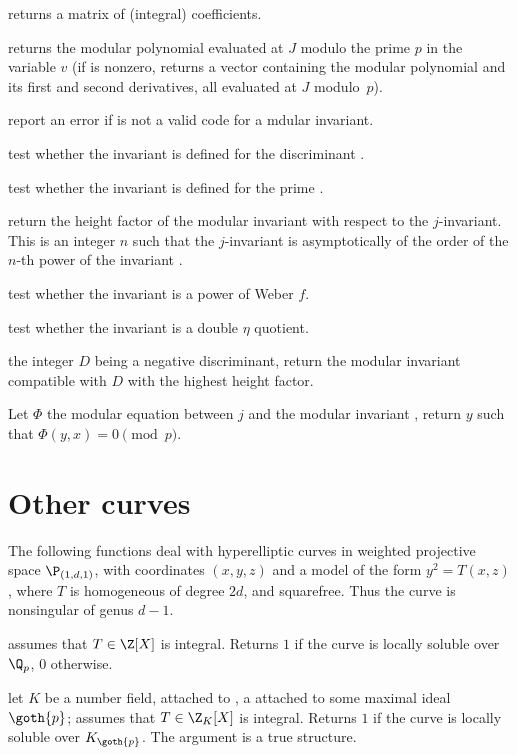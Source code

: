  returns a matrix of
(integral) coefficients.

 returns the modular polynomial evaluated
at $J$ modulo the prime $p$ in the variable $v$ (if  is nonzero,
returns a vector containing the modular polynomial and its first and second
derivatives, all evaluated at $J$ modulo~$p$).


 report an error if  is not a
valid code for a mdular invariant.

 test whether the
invariant  is defined for the discriminant .

 test whether the
invariant  is defined for the prime .

 return the height factor
of the modular invariant  with respect to the $j$-invariant.
This is an integer $n$ such that the $j$-invariant is asymptotically
of the order of the $n$-th power of the invariant .

 test whether the invariant
 is a power of Weber $f$.

 test whether the invariant
 is a double $\eta$ quotient.

 the integer $D$ being a negative discriminant,
return the modular invariant compatible with $D$ with the highest height
factor.

 Let $\Phi$ the modular equation
between $j$ and the modular invariant , return $y$ such that
$\Phi(y,x)=0\pmod{p}$.

\section{Other curves}

The following functions deal with hyperelliptic curves in weighted projective
space $\P_{(1,d,1)}$, with coordinates $(x,y,z)$ and a model of the form
$ y^2 = T(x,z)$, where $T$ is homogeneous of degree $2d$, and squarefree.
Thus the curve is nonsingular of genus $d-1$.

 assumes that $T\in\Z[X]$ is
integral. Returns $1$ if the curve is locally soluble over $\Q_p$, $0$
otherwise.

 let $K$
be a number field, attached to ,  a  attached
to some maximal ideal $\goth{p}$; assumes that $T\in\Z_K[X]$ is integral.
Returns $1$ if the curve is locally soluble over $K_{\goth{p}}$. The argument
 is a true  structure.

\newpage
